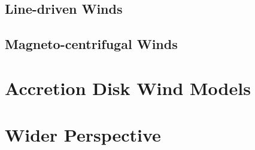 \subsection{Line-driven Winds}

\subsection{Magneto-centrifugal Winds}

\section{Accretion Disk Wind Models}

\section{Wider Perspective}

